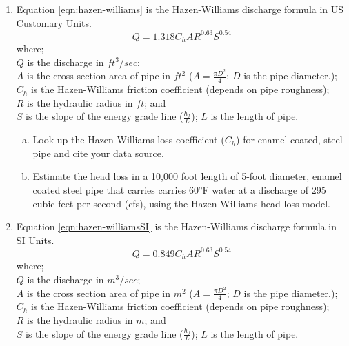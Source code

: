 \documentclass[12pt]{article}
\newcommand\tab[1][1cm]{\hspace*{#1}}
\begin{document}
\begin{enumerate}
\item Equation \ref{eqn:hazen-williams} is the  Hazen-Williams discharge formula in US Customary Units. 
\begin{equation}
Q = 1.318 C_h A R^{0.63} S^{0.54}
\label{eqn:hazen-williams}
\end{equation}
where;\\
\tab $Q$ is the discharge in $ft^3/sec$;\\
\tab $A$ is the cross section area of pipe in $ft^2$ ($A = \frac{\pi D^2}{4}$; $D$ is the pipe diameter.);\\
\tab $C_h$ is the Hazen-Williams friction coefficient (depends on pipe roughness);\\
\tab $R$ is the hydraulic radius in $ft$; and \\
\tab $S$ is the slope of the energy grade line ($\frac{h_f}{L}$); $L$ is the length of pipe.
\begin{enumerate}[(a)]
\item Look up the Hazen-Williams loss coefficient ($C_h$) for enamel coated, steel pipe and cite your data source.
\item Estimate the head loss in a 10,000 foot length of 5-foot diameter, enamel coated steel pipe that carries carries 60$^o$F water at a discharge of 295 cubic-feet per second (cfs), using the Hazen-Williams head loss model.
\end{enumerate}
\item Equation \ref{eqn:hazen-williamsSI} is the  Hazen-Williams discharge formula in SI Units. 
\begin{equation}
Q = 0.849 C_h A R^{0.63} S^{0.54}
\label{eqn:hazen-williamsSI}
\end{equation}
where;\\
\tab $Q$ is the discharge in $m^3/sec$;\\
\tab $A$ is the cross section area of pipe in $m^2$ ($A = \frac{\pi D^2}{4}$; $D$ is the pipe diameter.);\\
\tab $C_h$ is the Hazen-Williams friction coefficient (depends on pipe roughness);\\
\tab $R$ is the hydraulic radius in $m$; and \\
\tab $S$ is the slope of the energy grade line ($\frac{h_f}{L}$); $L$ is the length of pipe.
\begin{enumerate}[(a)]

\end{enumerate}
\end{enumerate}
\end{document}
